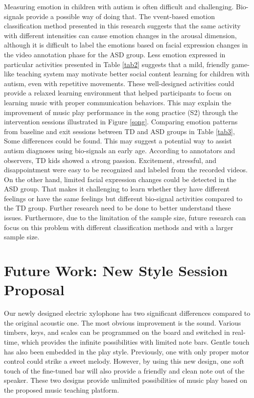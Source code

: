 Measuring emotion in children with autism is often difficult and challenging. Bio-signals provide a possible way of 
doing that. The vvent-based emotion classification method presented in this research suggests
that the same activity with different intensities can cause emotion changes in the arousal dimension,
although it is difficult to label the emotions based on facial expression changes in the video
annotation phase for the ASD group. Less emotion expressed in particular activities presented in Table \ref{tab2} suggests that a mild, 
friendly game-like teaching system may motivate better social content learning for children with autism, 
even with repetitive movements. These well-designed activities could provide a relaxed learning 
environment that helped participants to focus on learning music with proper communication behaviors. 
This may explain the improvement of music play performance in the song practice (S2) through the intervention 
sessions illustrated in Figure \ref{song}. Comparing emotion patterns from baseline and exit sessions between TD and ASD groups in Table \ref{tab3}, Some differences could be found. This may suggest a potential way to assist autism diagnoses using bio-signals 
an early age. According to annotators and observers, TD kids showed a strong passion. Excitement, stressful, and disappointment were easy to be recognized and labeled from the recorded videos. On the other hand, limited facial expression changes could be detected in
the ASD group. That makes it challenging to learn whether they have different feelings or have
the same feelings but different bio-signal activities compared to the TD group. Further research need to be done to better understand these issues. Furthermore, due to the limitation of the sample size, future research can focus on this problem with different classification methods and with a larger sample size.\\

\section{Future Work: New Style Session Proposal}
Our newly designed electric xylophone has two significant differences compared to the 
original acoustic one. The most obvious improvement is the sound. Various timbers, keys, and 
scales can be programmed on the board and switched in real-time, which provides the 
infinite possibilities with limited note bars. Gentle touch has also been embedded in the play
style. Previously, one with only proper motor control could strike a sweet melody. However, by using this 
new design, one soft touch of the fine-tuned bar will also provide a friendly and clean note out
of the speaker. These two designs provide unlimited possibilities of music play based on the proposed music teaching platform.\\

